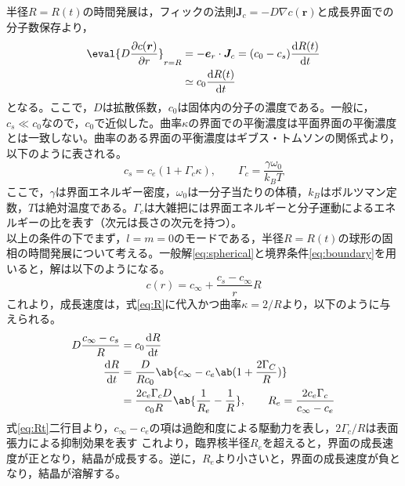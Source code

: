 \documentclass[autodetect-engine,dvi=dvipdfmx,a4paper,ja=standard,oneside,openany,11pt,draft]{bxjsbook}
\begin{document}
半径$R=R(t)$の時間発展は，フィックの法則$\bm{J}_c=-D\nabla c(\bm{r})$と成長界面での分子数保存より，
\begin{equation}
  \begin{split}
    \eval{D\pdv{c(\bm{r})}{r}}_{r=R} & = -\bm{e}_r\cdot\bm{J}_c = (c_0-c_s)\odv{R(t)}{t} \\
                                     & \simeq c_0\odv{R(t)}{t}
  \end{split}
  \label{eq:R}
\end{equation}
となる。ここで，$D$は拡散係数，$c_0$は固体内の分子の濃度である。一般に，$c_s\ll c_0$なので，$c_0$で近似した。曲率$\kappa$の界面での平衡濃度は平面界面の平衡濃度とは一致しない。曲率のある界面の平衡濃度はギブス・トムソンの関係式より，以下のように表される。
\begin{equation}
  c_s = c_e(1+\Gamma_c \kappa), \qquad \Gamma_c = \frac{\gamma \omega_0}{k_BT}
  \label{eq:Gibbs-Thomson}
\end{equation}
ここで，$\gamma$は界面エネルギー密度，$\omega_0$は一分子当たりの体積，$k_B$はボルツマン定数，$T$は絶対温度である。$\Gamma_c$は大雑把には界面エネルギーと分子運動によるエネルギーの比を表す（次元は長さの次元を持つ）。\\
以上の条件の下でまず，$l=m=0$のモードである，半径$R=R(t)$の球形の固相の時間発展について考える。一般解\ref{eq:spherical}と境界条件\ref{eq:boundary}を用いると，解は以下のようになる。
\begin{equation}
  c(r) = c_{\infty} + \frac{c_s-c_{\infty}}{r}R
  \label{eq:sphere}
\end{equation}
これより，成長速度は，式\ref{eq:R}に代入かつ曲率$\kappa=2/R$より，以下のように与えられる。
\begin{equation}
  \begin{split}
    D\frac{c_\infty-c_s}{R} & =c_0\odv{R}{t}                                                                                                 \\
    \odv{R}{t}              & = \frac{D}{Rc_0}\ab\{c_\infty-c_e\ab(1+\frac{2\Gamma_C}{R})\}                                                  \\
                            & = \frac{2c_e\Gamma_c D}{c_0 R}\ab\{\frac{1}{R_e}-\frac{1}{R}\}, \qquad R_e=\frac{2c_e \Gamma_c }{c_\infty-c_e}
  \end{split}
  \label{eq:Rt}
\end{equation}
式\ref{eq:Rt}二行目より，$c_\infty-c_e$の項は過飽和度による駆動力を表し，$2\Gamma_c/R$は表面張力による抑制効果を表す
これより，臨界核半径$R_e$を超えると，界面の成長速度が正となり，結晶が成長する。逆に，$R_e$より小さいと，界面の成長速度が負となり，結晶が溶解する。\\
\end{document}
